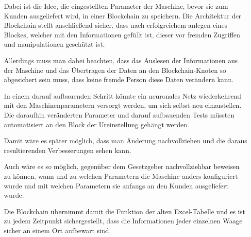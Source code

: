 Dabei ist die Idee, die eingestellten Parameter der Maschine, bevor sie zum Kunden ausgeliefert wird, in einer
Blockchain zu speichern. Die Architektur der Blockchain stellt anschließend sicher, dass nach erfolgreichem anlegen
eines Blockes, welcher mit den Informationen gefüllt ist, dieser vor fremden Zugriffen und manipulationen geschützt ist.

Allerdings muss man dabei beachten, dass das Auslesen der Informationen aus der Maschine und das Übertragen der Daten
an den Blockchain-Knoten so abgesichert sein muss, dass keine fremde Person diese Daten verändern kann.

In einem darauf aufbauenden Schritt könnte ein neuronales Netz wiederkehrend mit den Maschinenparametern versorgt werden,
um sich selbst neu einzustellen. Die daraufhin veränderten Parameter und darauf aufbauenden Tests müssten automatisiert
an den Block der Ureinstellung gehängt werden.

Damit wäre es später möglich, dass man Änderung nachvollziehen und die daraus resultierenden Verbesserungen sehen kann.

Auch wäre es so möglich, gegenüber dem Gesetzgeber nachvollziehbar beweisen zu können, wann und zu welchen Parametern
die Maschine anders konfiguriert wurde und mit welchen Parametern sie anfangs an den Kunden ausgeliefert wurde.

Die Blockchain übernimmt damit die Funktion der alten Excel-Tabelle und es ist zu jedem Zeitpunkt sichergestellt, dass
die Informationen jeder einzelnen Waage sicher an einem Ort aufbewart sind.